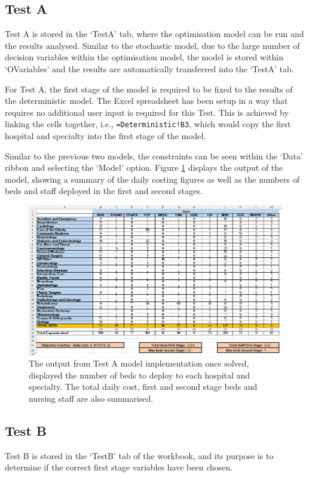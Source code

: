 \documentclass[../thesis.tex]{subfiles}
\begin{document}
\subsection{Test A}
Test A is stored in the `TestA' tab, where the optimisation model can be run and the results analysed. Similar to the stochastic model, due to the large number of decision variables within the optimisation model, the model is stored within `OVariables' and the results are automatically transferred into the `TestA' tab.

For Test A, the first stage of the model is required to be fixed to the results of the deterministic model. The Excel spreadsheet has been setup in a way that requires no additional user input is required for this Test. This is achieved by linking the cells together, i.e., \texttt{=Deterministic!B3}, which would copy the first hospital and specialty into the first stage of the model.

Similar to the previous two models, the constraints can be seen within the `Data' ribbon and selecting the `Model' option. Figure \ref{fig:testA} displays the output of the model, showing a summary of the daily costing figures as well as the numbers of beds and staff deployed in the first and second stages.

\begin{figure}[h!]
    \centering
    \includegraphics[width=\textwidth]{Chapters/Chapter7/Figures/TestA.png}
    \caption{The output from Test A model implementation once solved, displayed the number of beds to deploy to each hospital and specialty. The total daily cost, first and second stage beds and nursing staff are also summarised.}
    \label{fig:testA}
\end{figure}

\subsection{Test B}
Test B is stored in the `TestB' tab of the workbook, and its purpose is to determine if the correct first stage variables have been chosen. 
\end{document}
